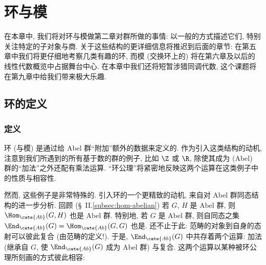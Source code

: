 
\chapter{环与模}
\label{chap:rings}


在本章中, 我们将对环与模做第二章对群所做的事情: 以一般的方式描述它们, 特别关注特定的子对象与商. 关于这些结构的更详细信息将推迟到后面的章节: 在第五章中我们将更仔细地考察几类有趣的环, 而模 (交换环上的) 将在第六章及以后的线性代数概览中占据舞台中心. 在本章中我们还将短暂涉猎同调代数, 这个课题将在第九章中给我们带来极大乐趣.

\section{环的定义}
\label{sec:ring-def}

\subsection{定义}
\label{subsec:ring-def}

环 (与模) 是通过给 Abel 群``附加''额外的数据来定义的. 作为引入这类结构的动机, 注意到我们所遇到的所有基于数的群的例子, 比如 $\Z$ 或 $\R$, 除使其成为 (Abel) 群的``加法''之外还配有乘法运算. ``环公理''将紧密地反映这两个运算在这类例子中的性质与相容性.

然而, 这些例子是非常特殊的. 引入环的一个更精致的动机, 来自对 Abel 群同态结构的进一步分析. 回顾 (\S~II.\ref{subsec:hom-abelian}) 若 $G$, $H$ 是 Abel 群, 则 $\Hom_{\cate{Ab}}(G, H)$ 也是 Abel 群. 特别地, 若 $G$ 是 Abel 群, 则自同态之集 $\End_{\cate{Ab}}(G) = \Hom_{\cate{Ab}}(G, G)$ 也是. 还不止于此: 范畴的对象到自身的态射可以彼此复合 (由范畴的定义!). 于是, $\End_{\cate{Ab}}(G)$ 中共存着两个运算: 加法 (继承自 $G$, 使 $\End_{\cate{Ab}}(G)$ 成为 Abel 群) 与复合. 这两个运算以某种被环公理所刻画的方式彼此相容:

